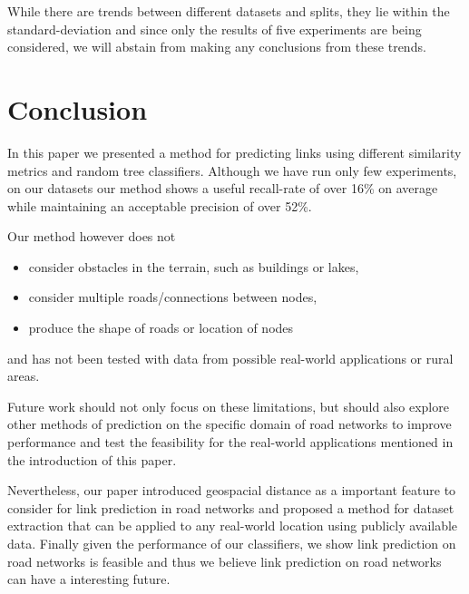 \documentclass[12pt,a4paper]{IEEEtran}
\begin{document}
While there are trends between different datasets and splits,
they lie within the standard-deviation and since only the results of five experiments are being considered,
we will abstain from making any conclusions from these trends.

\section{Conclusion}\label{sec:conclusion}

In this paper we presented a method for predicting links using different similarity metrics and random tree classifiers.
Although we have run only few experiments,
on our datasets our method shows a useful recall-rate of over 16\% on average while maintaining an acceptable precision of over 52\%.

Our method however does not
\begin{itemize}
\item consider obstacles in the terrain, such as buildings or lakes,
\item consider multiple roads/connections between nodes,
\item produce the shape of roads or location of nodes
\end{itemize}
and has not been tested with data from possible real-world applications or rural areas.

Future work should not only focus on these limitations,
but should also explore other methods of prediction on the specific domain of road networks to improve performance
and test the feasibility for the real-world applications mentioned in the introduction of this paper.

Nevertheless, our paper introduced geospacial distance as a important feature to consider for link prediction in road networks and
proposed a method for dataset extraction that can be applied to any real-world location using publicly available data.
Finally given the performance of our classifiers, we show link prediction
on road networks is feasible and thus we believe link prediction on road networks can have a interesting future.


\theendnotes

\printbibliography
\end{document}
